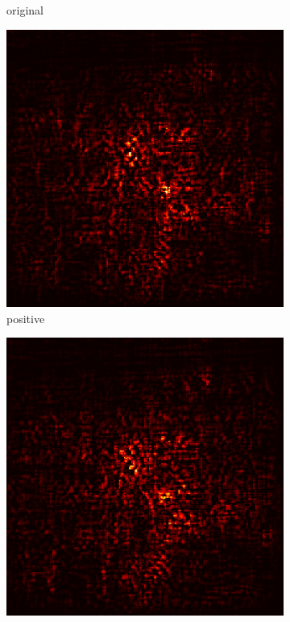 \documentclass[preprint,12pt]{elsarticle}
\begin{document}
\begin{figure}
\begin{subfigure}{0.14\linewidth}
        \caption{original}
    \end{subfigure}
    \hfill
    \begin{subfigure}{0.14\textwidth}
        \centering
        \includegraphics[width=\linewidth]{../visualizations/examples/imagenette/resnet18/positive_saliency_map/3.png}
        \caption{positive}
    \end{subfigure}
    \hfill
    \begin{subfigure}{0.14\textwidth}
        \centering
        \includegraphics[width=\linewidth]{../visualizations/examples/imagenette/resnet18/negative_saliency_map/3.png}

\end{subfigure}
\end{figure}
\end{document}
